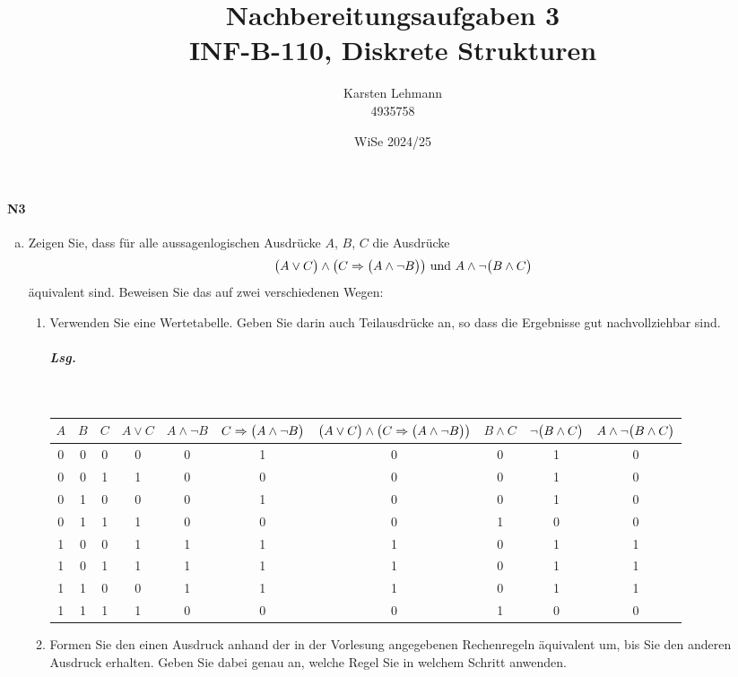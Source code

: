 \documentclass{scrreprt}
\author{Karsten Lehmann \\ 4935758}
\date{WiSe 2024/25}
\title{Nachbereitungsaufgaben 3\\INF-B-110, Diskrete Strukturen}
\begin{document}
\begin{landscape}
\paragraph{N3}
\begin{enumerate}[(a)]
\item Zeigen Sie, dass für alle aussagenlogischen Ausdrücke $A$, $B$, $C$ die
  Ausdrücke
  \[
    \qty\big(A \lor C) \land \qty\big(C \Rightarrow \qty\big(A \land \neg B))
    \text{ und }
    A \land \neg \qty\big(B \land C)
  \]
  äquivalent sind.
  Beweisen Sie das auf zwei verschiedenen Wegen:
  \begin{enumerate}[(1)]
  \item Verwenden Sie eine Wertetabelle.
    Geben Sie darin auch Teilausdrücke an, so dass die Ergebnisse gut
    nachvollziehbar sind.

    \subparagraph{Lsg.}\;\\
    \begin{small}
      \begin{tabular}{|c|c|c|c|c|c|c|c|c|c|}
        \hline
        $A$ & $B$ & $C$ & $A \lor C$ & $A \land \neg B$ & $C \Rightarrow \qty\big(A \land \neg B)$ & $\qty\big(A \lor C) \land \qty\big(C \Rightarrow \qty\big(A \land \neg B))$ & $B \land C$ & $\neg \qty\big(B \land C)$ & $A \land \neg \qty\big(B \land C)$ \\
        \hline
        0 & 0 & 0 & 0 & 0 & 1 & 0 & 0 & 1 & 0 \\
        0 & 0 & 1 & 1 & 0 & 0 & 0 & 0 & 1 & 0 \\
        0 & 1 & 0 & 0 & 0 & 1 & 0 & 0 & 1 & 0 \\
        0 & 1 & 1 & 1 & 0 & 0 & 0 & 1 & 0 & 0 \\
        1 & 0 & 0 & 1 & 1 & 1 & 1 & 0 & 1 & 1 \\
        1 & 0 & 1 & 1 & 1 & 1 & 1 & 0 & 1 & 1 \\
        1 & 1 & 0 & 0 & 1 & 1 & 1 & 0 & 1 & 1 \\
        1 & 1 & 1 & 1 & 0 & 0 & 0 & 1 & 0 & 0 \\
        \hline
      \end{tabular}
    \end{small}

  \item Formen Sie den einen Ausdruck anhand der in der Vorlesung angegebenen
    Rechenregeln äquivalent um, bis Sie den anderen Ausdruck erhalten.
    Geben Sie dabei genau an, welche Regel Sie in welchem Schritt anwenden.


\end{enumerate}
\end{enumerate}
\end{landscape}
\end{document}
